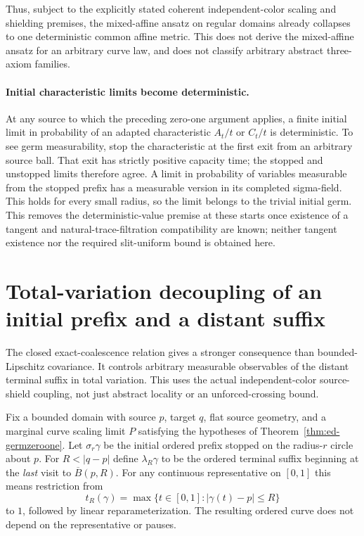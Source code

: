 \documentclass[11pt]{article}
\theoremstyle{definition}\newtheorem{definition}[theorem]{Definition}
\theoremstyle{remark}\newtheorem{remark}[theorem]{Remark}
\begin{document}
Thus, subject to the explicitly stated coherent independent-color scaling
and shielding premises, the mixed-affine ansatz on regular domains
already collapses to one deterministic common affine metric. This does
not derive the mixed-affine ansatz for an arbitrary curve law, and does
not classify arbitrary abstract three-axiom families.

\paragraph{Initial characteristic limits become deterministic.}
At any source to which the preceding zero-one argument applies, a finite
initial limit in probability of an adapted characteristic $A_t/t$ or
$C_t/t$ is deterministic. To see germ measurability, stop the characteristic
at the first exit from an arbitrary source ball. That exit has strictly
positive capacity time; the stopped and unstopped limits therefore agree.
A limit in probability of variables measurable from the stopped prefix has
a measurable version in its completed sigma-field. This holds for every
small radius, so the limit belongs to the trivial initial germ.
This removes the deterministic-value premise at these starts once existence
of a tangent and natural-trace-filtration compatibility are known; neither
tangent existence nor the required slit-uniform bound is obtained here.



\section{Total-variation decoupling of an initial prefix and a distant suffix}
\label{sec:spatial-beta-mixing}

The closed exact-coalescence relation gives a stronger consequence than
bounded-Lipschitz covariance. It controls arbitrary measurable observables
of the distant terminal suffix in total variation. This uses the actual
independent-color source-shield coupling, not just abstract locality or
an unforced-crossing bound.

Fix a bounded domain with source $p$, target $q$, flat source geometry,
and a marginal curve scaling limit $P$ satisfying the hypotheses of
Theorem~\ref{thm:ed-germzeroone}. Let $\sigma_r\gamma$ be the initial
ordered prefix stopped on the radius-$r$ circle about $p$. For
$R<|q-p|$ define $\lambda_R\gamma$ to be the ordered terminal suffix
beginning at the \emph{last} visit to $\overline B(p,R)$. For any
continuous representative on $[0,1]$ this means restriction from
\[
 t_R(\gamma)=\max\{t\in[0,1]:|\gamma(t)-p|\leq R\}
\]
to $1$, followed by linear reparameterization. The resulting ordered
curve does not depend on the representative or pauses.
\end{document}
